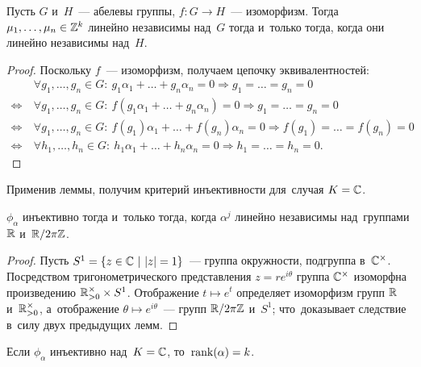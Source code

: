 \documentclass{article}
\begin{document}
\begin{lemma}
    Пусть $G$ и~$H$~— абелевы группы, $f : G \rightarrow H$~— изоморфизм. Тогда $\mu_1, \ldots, \mu_n \in \mathbb{Z}^k$
    линейно независимы над~$G$ тогда и~только тогда, когда они линейно независимы над~$H$.
\end{lemma}

\begin{proof}
    Поскольку $f$~— изоморфизм, получаем цепочку эквивалентностей:
    \begin{align*}
                       &\ \forall g_1, \ldots, g_n \in G{:}\ g_1 \alpha_1 + \ldots + g_n \alpha_n = 0 \Rightarrow g_1 = \ldots = g_n = 0 \\
        \Leftrightarrow&\ \forall g_1, \ldots, g_n \in G{:}\ f(g_1 \alpha_1 + \ldots + g_n \alpha_n) = 0 \Rightarrow g_1 = \ldots = g_n = 0 \\
        \Leftrightarrow&\ \forall g_1, \ldots, g_n \in G{:}\ f(g_1) \alpha_1 + \ldots + f(g_n) \alpha_n = 0 \Rightarrow f(g_1) = \ldots = f(g_n) = 0 \\
        \Leftrightarrow&\ \forall h_1, \ldots, h_n \in G{:}\ h_1 \alpha_1 + \ldots + h_n \alpha_n = 0 \Rightarrow h_1 = \ldots = h_n = 0.
    \end{align*}
\end{proof}

Применив леммы, получим критерий инъективности для~случая $K = \mathbb{C}$.

\begin{consequence*}
    $\phi_\alpha$ инъективно тогда и~только тогда, когда $\alpha^j$ линейно независимы над~группами $\mathbb{R}$ и~$\mathbb{R} / 2 \pi \mathbb{Z}$.
\end{consequence*}

\begin{proof}
    Пусть $S^1 = \{ z \in \mathbb{C}\ | \ |z| = 1 \}$~— группа окружности, подгруппа в~$\mathbb{C}^\times$.
    Посредством тригонометрического представления $z = re^{i \theta}$ группа $\mathbb{C}^\times$
    изоморфна произведению $\mathbb{R}_{> 0}^\times \times S^1$. Отображение $t \mapsto e^t$ определяет
    изоморфизм групп $\mathbb{R}$ и~$\mathbb{R}_{> 0}^\times$, а~отображение $\theta \mapsto e^{i\theta}$~— групп $\mathbb{R} / 2 \pi \mathbb{Z}$ и~$S^1$;
    что~доказывает следствие в~силу двух предыдущих лемм.
\end{proof}

\begin{consequence*}
    Если $\phi_\alpha$ инъективно над~$K = \mathbb{C}$, то~$\mathrm{rank}(\alpha) = k$.
\end{consequence*}
\end{document}

